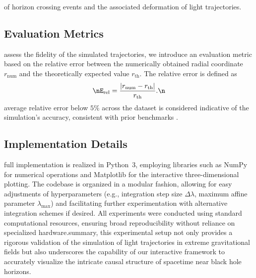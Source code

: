 \documentclass{article}
\begin{document}
of horizon crossing events and the associated deformation of light trajectories.\n\n\subsection{Evaluation Metrics}\nTo assess the fidelity of the simulated trajectories, we introduce an evaluation metric based on the relative error between the numerically obtained radial coordinate $r_{\text{num}}$ and the theoretically expected value $r_{\text{th}}$. The relative error is defined as\n\begin{equation}\nE_{\text{rel}} = \frac{|r_{\text{num}}-r_{\text{th}}|}{r_{\text{th}}}.\n\end{equation}\nAn average relative error below $5\%$ across the dataset is considered indicative of the simulation's accuracy, consistent with prior benchmarks \cite{ref1, ref2}.\n\n\subsection{Implementation Details}\nThe full implementation is realized in Python~3, employing libraries such as NumPy for numerical operations and Matplotlib for the interactive three-dimensional plotting. The codebase is organized in a modular fashion, allowing for easy adjustments of hyperparameters (e.g., integration step size $\Delta \lambda$, maximum affine parameter $\lambda_{\max}$) and facilitating further experimentation with alternative integration schemes if desired. All experiments were conducted using standard computational resources, ensuring broad reproducibility without reliance on specialized hardware.\n\nIn summary, this experimental setup not only provides a rigorous validation of the simulation of light trajectories in extreme gravitational fields but also underscores the capability of our interactive framework to accurately visualize the intricate causal structure of spacetime near black hole horizons.
\end{document}
